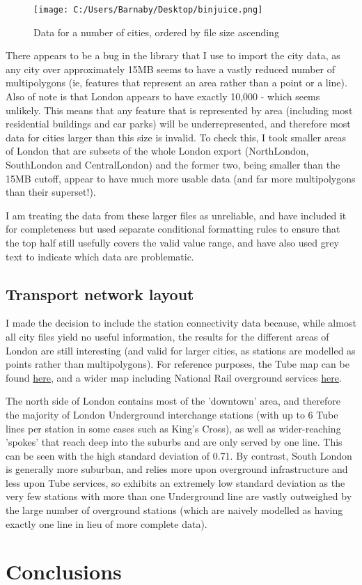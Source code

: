 \documentclass[11pt]{article} %
\begin{document}
\begin{figure}
	\texttt{[image: C:/Users/Barnaby/Desktop/binjuice.png]}
	\caption{Data for a number of cities, ordered by file size ascending}
	\label{Fig:1}
\end{figure}

There appears to be a bug in the library that I use to import the city data, as any city over approximately 15MB seems to have a vastly reduced number of multipolygons (ie, features that represent an area rather than a point or a line). Also of note is that London appears to have exactly 10,000 - which seems unlikely. This means that any feature that is represented by area (including most residential buildings and car parks) will be underrepresented, and therefore most data for cities larger than this size is invalid. To check this, I took smaller areas of London that are subsets of the whole London export (NorthLondon, SouthLondon and CentralLondon) and the former two, being smaller than the 15MB cutoff, appear to have much more usable data (and far more multipolygons than their superset!).

I am treating the data from these larger files as unreliable, and have included it for completeness but used separate conditional formatting rules to ensure that the top half still usefully covers the valid value range, and have also used grey text to indicate which data are problematic.

\subsection{Transport network layout}
I made the decision to include the station connectivity data because, while almost all city files yield no useful information, the results for the different areas of London are still interesting (and valid for larger cities, as stations are modelled as points rather than multipolygons). For reference purposes, the Tube map can be found \href{https://content.tfl.gov.uk/standard-tube-map.pdf}{here}, and a wider map including National Rail overground services \href{https://content.tfl.gov.uk/london-rail-and-tube-services-map.pdf}{here}.

The north side of London contains most of the 'downtown' area, and therefore the majority of London Underground interchange stations (with up to 6 Tube lines per station in some cases such as King's Cross), as well as wider-reaching 'spokes' that reach deep into the suburbs and are only served by one line. This can be seen with the high standard deviation of 0.71. By contrast, South London is generally more suburban, and relies more upon overground infrastructure and less upon Tube services, so exhibits an extremely low standard deviation as the very few stations with more than one Underground line are vastly outweighed by the large number of overground stations (which are naively modelled as having exactly one line in lieu of more complete data).




\section{Conclusions}

\printbibliography
\end{document}
